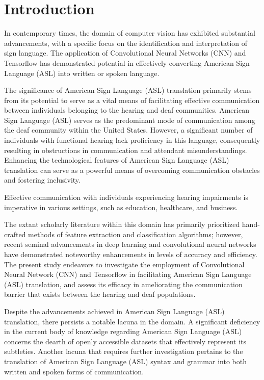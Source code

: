 \documentclass[conference]{IEEEtran}
\begin{document}
\section{Introduction}
In contemporary times, the domain of computer vision has exhibited substantial advancements, with a specific focus on the identification and interpretation of sign language. The application of Convolutional Neural Networks (CNN) and Tensorflow has demonstrated potential in effectively converting American Sign Language (ASL) into written or spoken language.

The significance of American Sign Language (ASL) translation primarily stems from its potential to serve as a vital means of facilitating effective communication between individuals belonging to the hearing and deaf communities. American Sign Language (ASL) serves as the predominant mode of communication among the deaf community within the United States. However, a significant number of individuals with functional hearing lack proficiency in this language, consequently resulting in obstructions in communication and attendant misunderstandings. Enhancing the technological features of American Sign Language (ASL) translation can serve as a powerful means of overcoming communication obstacles and fostering inclusivity.

Effective communication with individuals experiencing hearing impairments is imperative in various settings, such as education, healthcare, and business.

The extant scholarly literature within this domain has primarily prioritized hand-crafted methods of feature extraction and classification algorithms; however, recent seminal advancements in deep learning and convolutional neural networks have demonstrated noteworthy enhancements in levels of accuracy and efficiency. The present study endeavors to investigate the employment of Convolutional Neural Network (CNN) and Tensorflow in facilitating American Sign Language (ASL) translation, and assess its efficacy in ameliorating the communication barrier that exists between the hearing and deaf populations.

Despite the advancements achieved in American Sign Language (ASL) translation, there persists a notable lacuna in the domain. A significant deficiency in the current body of knowledge regarding American Sign Language (ASL) concerns the dearth of openly accessible datasets that effectively represent its subtleties. Another lacuna that requires further investigation pertains to the translation of American Sign Language (ASL) syntax and grammar into both written and spoken forms of communication.
\end{document}
